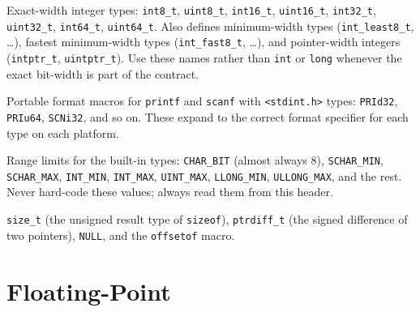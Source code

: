 \begin{description}[leftmargin=0pt, itemsep=10pt]

\item[\texttt{<stdint.h>} \textnormal{(C99)}]
Exact-width integer types: \texttt{int8\_t}, \texttt{uint8\_t},
\texttt{int16\_t}, \texttt{uint16\_t}, \texttt{int32\_t}, \texttt{uint32\_t},
\texttt{int64\_t}, \texttt{uint64\_t}.
Also defines minimum-width types (\texttt{int\_least8\_t}, \ldots),
fastest minimum-width types (\texttt{int\_fast8\_t}, \ldots),
and pointer-width integers (\texttt{intptr\_t}, \texttt{uintptr\_t}).
Use these names rather than \texttt{int} or \texttt{long} whenever the
exact bit-width is part of the contract.

\item[\texttt{<inttypes.h>} \textnormal{(C99)}]
Portable format macros for \texttt{printf} and \texttt{scanf} with
\texttt{<stdint.h>} types: \texttt{PRId32}, \texttt{PRIu64},
\texttt{SCNi32}, and so on. These expand to the correct format specifier
for each type on each platform.

\item[\texttt{<limits.h>}]
Range limits for the built-in types: \texttt{CHAR\_BIT} (almost always 8),
\texttt{SCHAR\_MIN}, \texttt{SCHAR\_MAX}, \texttt{INT\_MIN}, \texttt{INT\_MAX},
\texttt{UINT\_MAX}, \texttt{LLONG\_MIN}, \texttt{ULLONG\_MAX}, and the rest.
Never hard-code these values; always read them from this header.

\item[\texttt{<stddef.h>}]
\texttt{size\_t} (the unsigned result type of \texttt{sizeof}),
\texttt{ptrdiff\_t} (the signed difference of two pointers), \texttt{NULL},
and the \texttt{offsetof} macro.

\end{description}

\section{Floating-Point}

